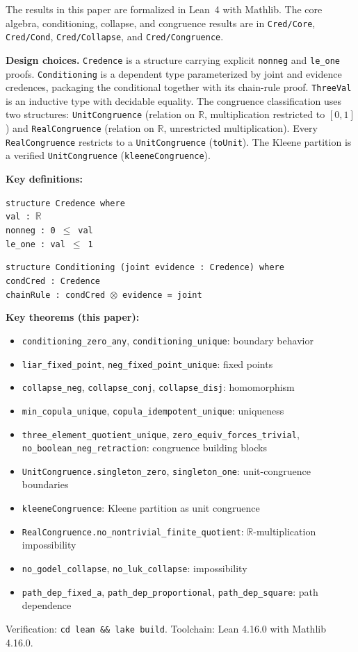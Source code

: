 \documentclass[11pt,a4paper]{article}
\newcommand{\Real}{\mathbb{R}}
\begin{document}
The results in this paper are formalized in Lean~4 with Mathlib.
The core algebra, conditioning, collapse, and congruence results are in
\texttt{Cred/Core}, \texttt{Cred/Cond}, \texttt{Cred/Collapse}, and
\texttt{Cred/Congruence}.

\textbf{Design choices.}
\texttt{Credence} is a structure carrying explicit \texttt{nonneg} and
\texttt{le\_one} proofs.
\texttt{Conditioning} is a dependent type parameterized by joint and
evidence credences, packaging the conditional together with its chain-rule
proof.
\texttt{ThreeVal} is an inductive type with decidable equality.
The congruence classification uses two structures:
\texttt{UnitCongruence} (relation on $\mathbb{R}$, multiplication
restricted to $[0,1]$) and \texttt{RealCongruence} (relation on
$\mathbb{R}$, unrestricted multiplication).
Every \texttt{RealCongruence} restricts to a \texttt{UnitCongruence}
(\texttt{toUnit}).
The Kleene partition is a verified \texttt{UnitCongruence}
(\texttt{kleeneCongruence}).

\textbf{Key definitions:}

\medskip
\noindent
\texttt{structure Credence where}\\
\null\quad \texttt{val :}~$\Real$\\
\null\quad \texttt{nonneg : 0}~$\leq$~\texttt{val}\\
\null\quad \texttt{le\_one : val}~$\leq$~\texttt{1}

\medskip
\noindent
\texttt{structure Conditioning (joint evidence : Credence) where}\\
\null\quad \texttt{condCred : Credence}\\
\null\quad \texttt{chainRule : condCred}~$\otimes$~\texttt{evidence = joint}

\medskip
\textbf{Key theorems (this paper):}
\begin{itemize}[nosep]
\item \texttt{conditioning\_zero\_any},
  \texttt{conditioning\_unique}: boundary behavior
\item \texttt{liar\_fixed\_point},
  \texttt{neg\_fixed\_point\_unique}: fixed points
\item \texttt{collapse\_neg}, \texttt{collapse\_conj},
  \texttt{collapse\_disj}: homomorphism
\item \texttt{min\_copula\_unique},
  \texttt{copula\_idempotent\_unique}: uniqueness
\item \texttt{three\_element\_quotient\_unique},
  \texttt{zero\_equiv\_forces\_trivial},
  \texttt{no\_boolean\_neg\_retraction}: congruence building blocks
\item \texttt{UnitCongruence.singleton\_zero},
  \texttt{singleton\_one}: unit-congruence boundaries
\item \texttt{kleeneCongruence}: Kleene partition as unit congruence
\item \texttt{RealCongruence.no\_nontrivial\_finite\_quotient}:
  $\mathbb{R}$-multiplication impossibility
\item \texttt{no\_godel\_collapse}, \texttt{no\_luk\_collapse}:
  impossibility
\item \texttt{path\_dep\_fixed\_a}, \texttt{path\_dep\_proportional},
  \texttt{path\_dep\_square}: path dependence
\end{itemize}

Verification: \texttt{cd lean \&\& lake build}.
Toolchain: Lean 4.16.0 with Mathlib 4.16.0.
\end{document}
